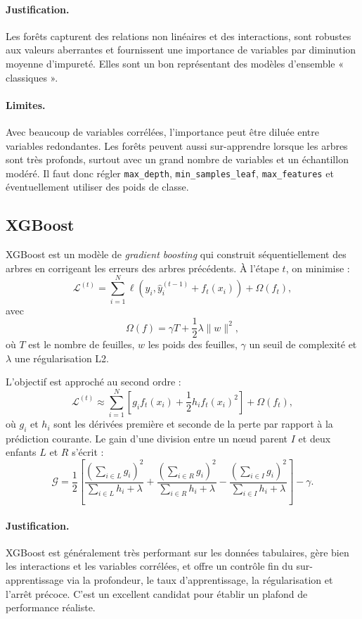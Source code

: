 \documentclass[11pt,a4paper]{article}
\begin{document}
\paragraph{Justification.}
Les forêts capturent des relations non linéaires et des interactions, sont robustes aux valeurs aberrantes et fournissent une importance de variables par diminution moyenne d'impureté. Elles sont un bon représentant des modèles d'ensemble « classiques ».

\paragraph{Limites.}
Avec beaucoup de variables corrélées, l'importance peut être diluée entre variables redondantes. Les forêts peuvent aussi sur-apprendre lorsque les arbres sont très profonds, surtout avec un grand nombre de variables et un échantillon modéré. Il faut donc régler \texttt{max\_depth}, \texttt{min\_samples\_leaf}, \texttt{max\_features} et éventuellement utiliser des poids de classe.

\subsection{XGBoost}

XGBoost \citep{chen2016} est un modèle de \emph{gradient boosting} qui construit séquentiellement des arbres en corrigeant les erreurs des arbres précédents. À l'étape \(t\), on minimise :
\[
\mathcal{L}^{(t)}
= \sum_{i=1}^N
\ell\left(y_i, \hat y_i^{(t-1)} + f_t(x_i)\right)
+ \Omega(f_t),
\]
avec
\[
\Omega(f) = \gamma T + \frac{1}{2}\lambda \|w\|^2,
\]
où \(T\) est le nombre de feuilles, \(w\) les poids des feuilles, \(\gamma\) un seuil de complexité et \(\lambda\) une régularisation L2.

L'objectif est approché au second ordre :
\[
\mathcal{L}^{(t)}
\approx
\sum_{i=1}^N
\left[
g_i f_t(x_i) + \frac{1}{2} h_i f_t(x_i)^2
\right]
+ \Omega(f_t),
\]
où \(g_i\) et \(h_i\) sont les dérivées première et seconde de la perte par rapport à la prédiction courante. Le gain d'une division entre un nœud parent \(I\) et deux enfants \(L\) et \(R\) s'écrit :
\[
\mathcal{G}
=
\frac{1}{2}
\left[
\frac{(\sum_{i\in L} g_i)^2}{\sum_{i\in L} h_i + \lambda}
+
\frac{(\sum_{i\in R} g_i)^2}{\sum_{i\in R} h_i + \lambda}
-
\frac{(\sum_{i\in I} g_i)^2}{\sum_{i\in I} h_i + \lambda}
\right]
- \gamma.
\]

\paragraph{Justification.}
XGBoost est généralement très performant sur les données tabulaires, gère bien les interactions et les variables corrélées, et offre un contrôle fin du sur-apprentissage via la profondeur, le taux d'apprentissage, la régularisation et l'arrêt précoce. C'est un excellent candidat pour établir un plafond de performance réaliste.
\end{document}
